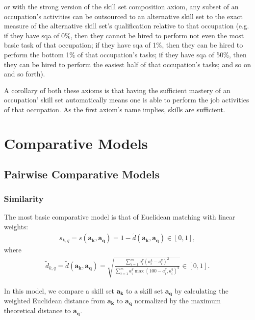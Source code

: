 \documentclass{elsarticle} %
\begin{document}
or with the strong version of the skill set composition axiom, any subset of an occupation's activities can be outsourced to an alternative skill set to the exact measure of the alternative skill set's qualification relative to that occupation (e.g. if they have sqa of 0\%, then they cannot be hired to perform not even the most basic task of that occupation; if they have sqa of 1\%, then they can be hired to perform the bottom 1\% of that occupation's tasks; if they have sqa of 50\%, then they can be hired to perform the easiest half of that occupation's tasks; and so on and so forth).

A corollary of both these axioms is that having the sufficient mastery of an occupation' skill set automatically means one is able to perform the job activities of that occupation. 
As the first axiom's name implies, skills are sufficient.


\section{Comparative Models}
\subsection{Pairwise Comparative Models}
\subsubsection{Similarity}
The most basic comparative model is that of Euclidean matching with linear
weights:
\begin{gather}
    s_{k,q} =
    s(\boldsymbol{a_k}, \boldsymbol{a_q}) =
    1 - \tilde{d}(\boldsymbol{a_k}, \boldsymbol{a_q})
    \in [0,1]
    ,
\end{gather}
where
\begin{gather}
    \tilde{d}_{k,q} =
    \tilde{d}(\boldsymbol{a_k}, \boldsymbol{a_q}) =
    \sqrt{
    \frac{
    \sum_{i = 1}^{m}{
    a_{i}^{q} (a_{i}^{k} - a_{i}^{q})^2
    }
    }{
    \sum_{i = 1}^{m}{
    a_{i}^{q} \max(100 - a_{i}^{q}, a_{i}^{q})^2
    }
    }
    }
    \in [0,1]
    .
\end{gather}

In this model, we compare a skill set $\boldsymbol{a_k}$ to a skill set
$\boldsymbol{a_q}$ by calculating the weighted Euclidean distance from
$\boldsymbol{a_k}$ to $\boldsymbol{a_q}$ normalized by the maximum theoretical
distance to $\boldsymbol{a_q}$.
\end{document}
